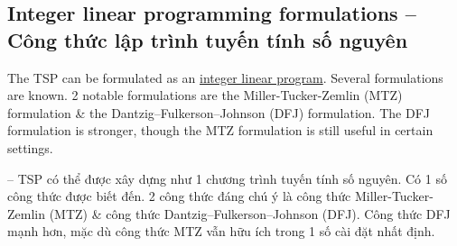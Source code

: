 \documentclass{article}
\begin{document}

\subsection{Integer linear programming formulations -- Công thức lập trình tuyến tính số nguyên}
The TSP can be formulated as an \href{https://en.wikipedia.org/wiki/Integer_programming}{integer linear program}. Several formulations are known. 2 notable formulations are the Miller-Tucker-Zemlin (MTZ) formulation \& the Dantzig--Fulkerson--Johnson (DFJ) formulation. The DFJ formulation is stronger, though the MTZ formulation is still useful in certain settings.

-- TSP có thể được xây dựng như 1 chương trình tuyến tính số nguyên. Có 1 số công thức được biết đến. 2 công thức đáng chú ý là công thức Miller-Tucker-Zemlin (MTZ) \& công thức Dantzig--Fulkerson--Johnson (DFJ). Công thức DFJ mạnh hơn, mặc dù công thức MTZ vẫn hữu ích trong 1 số cài đặt nhất định.
\end{document}

